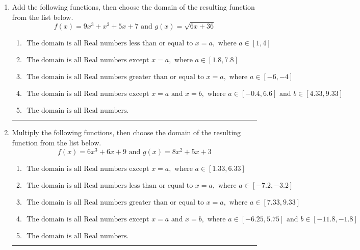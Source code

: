 \documentclass[14pt]{extbook}
\newcommand{\litem}[1]{\item#1\hspace*{-1cm}\rule{\textwidth}{0.4pt}}
\begin{document}
\begin{enumerate}
{\begin{enumerate}[label=\Alph*.]
\end{enumerate} }
\litem{
Add the following functions, then choose the domain of the resulting function from the list below.\[ f(x) = 9x^{3} + x^{2} +5 x + 7 \text{ and } g(x) = \sqrt{6x+36}  \]\begin{enumerate}[label=\Alph*.]
\item \( \text{ The domain is all Real numbers less than or equal to } x = a, \text{ where } a \in [1, 4] \)
\item \( \text{ The domain is all Real numbers except } x = a, \text{ where } a \in [1.8, 7.8] \)
\item \( \text{ The domain is all Real numbers greater than or equal to } x = a, \text{ where } a \in [-6, -4] \)
\item \( \text{ The domain is all Real numbers except } x = a \text{ and } x = b, \text{ where } a \in [-0.4, 6.6] \text{ and } b \in [4.33, 9.33] \)
\item \( \text{ The domain is all Real numbers. } \)

\end{enumerate} }
\litem{
Multiply the following functions, then choose the domain of the resulting function from the list below.\[ f(x) = 6x^{3} +6 x + 9 \text{ and } g(x) = 8x^{2} +5 x + 3 \]\begin{enumerate}[label=\Alph*.]
\item \( \text{ The domain is all Real numbers except } x = a, \text{ where } a \in [1.33, 6.33] \)
\item \( \text{ The domain is all Real numbers less than or equal to } x = a, \text{ where } a \in [-7.2, -3.2] \)
\item \( \text{ The domain is all Real numbers greater than or equal to } x = a, \text{ where } a \in [7.33, 9.33] \)
\item \( \text{ The domain is all Real numbers except } x = a \text{ and } x = b, \text{ where } a \in [-6.25, 5.75] \text{ and } b \in [-11.8, -1.8] \)
\item \( \text{ The domain is all Real numbers. } \)

\end{enumerate} }
\end{enumerate}
\end{document}
